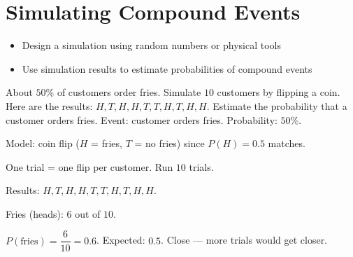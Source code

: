\section{Simulating Compound Events}

\begin{stepGoal}
\begin{itemize}
    \item Design a simulation using random numbers or physical tools
    \item Use simulation results to estimate probabilities of compound events
\end{itemize}
\end{stepGoal}

\begin{stepVocabBox}
\end{stepVocabBox}

\begin{stepsCard}
\end{stepsCard}

\begin{stepExample}{About $50\%$ of customers order fries. Simulate $10$ customers by flipping a coin. Here are the results: $H, T, H, H, T, T, H, T, H, H$. Estimate the probability that a customer orders fries.}
     Event: customer orders fries. Probability: $50\%$.

     Model: coin flip ($H$ = fries, $T$ = no fries) since $P(H) = 0.5$ matches.

     One trial = one flip per customer. Run $10$ trials.\par
    Results: $H, T, H, H, T, T, H, T, H, H$.

     Fries (heads): $6$ out of $10$.\par
    $P(\text{fries}) = \dfrac{6}{10} = 0.6$. Expected: $0.5$. Close --- more trials would get closer.
\end{stepExample}

